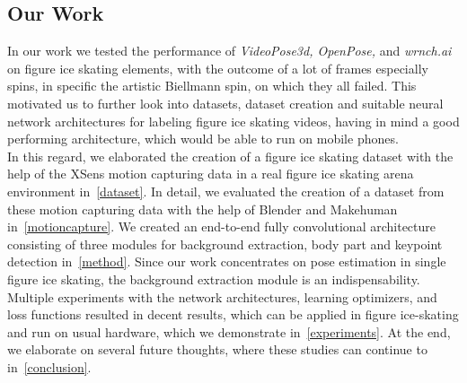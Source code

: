     \subsection*{Our Work}
    In our work we tested the performance of \textit{VideoPose3d, OpenPose,} and \textit{wrnch.ai} on figure ice skating elements,
with the outcome of a lot of frames especially spins, in specific the artistic Biellmann spin, on which they all failed.
This motivated us to further look into datasets, dataset creation and suitable neural network architectures for labeling
figure ice skating videos, having in mind a good performing architecture, which would be able to run on mobile phones.\\
    In this regard, we elaborated the creation of a figure ice skating dataset with the help of the XSens motion capturing data in a
    real figure ice skating arena
    environment in~\autoref{dataset}.
    In detail, we evaluated the creation of a dataset from these motion capturing data with the help of Blender and
    Makehuman in~\autoref{motioncapture}.
    We created an end-to-end fully convolutional architecture consisting of three modules for background extraction,
    body part and keypoint detection in~\autoref{method}.
    Since our work concentrates on pose estimation in single figure ice skating, the background extraction module is
    an indispensability.
    Multiple experiments with the network architectures, learning optimizers, and loss functions resulted in decent
    results,
    which can be applied in figure ice-skating and run on usual hardware, which we demonstrate in~\autoref{experiments}.
    At the end, we elaborate on several future thoughts, where these studies can continue to in~\autoref{conclusion}.



